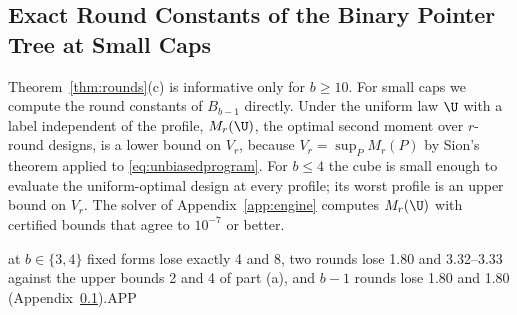 \subsection{Exact Round Constants of the Binary Pointer Tree at Small Caps}\label{app:pointerexact}
Theorem~\ref{thm:rounds}(c) is informative only for $b\ge10$. For small caps we compute the round constants of $B_{b-1}$ directly. Under the uniform law $\U$ with a label independent of the profile, $M_r(\U)$, the optimal second moment over $r$-round designs, is a lower bound on $V_r$, because $V_r=\sup_PM_r(P)$ by Sion's theorem applied to \eqref{eq:unbiasedprogram}. For $b\le4$ the cube is small enough to evaluate the uniform-optimal design at every profile; its worst profile is an upper bound on $V_r$. The solver of Appendix~\ref{app:engine} computes $M_r(\U)$ with certified bounds that agree to $10^{-7}$ or better.

at $b\in\{3,4\}$ fixed forms lose exactly 4 and 8, two rounds lose 1.80 and 3.32--3.33 against the upper bounds 2 and 4 of part (a), and $b-1$ rounds lose 1.80 and 1.80 (Appendix~\ref{app:pointerexact}).APP
